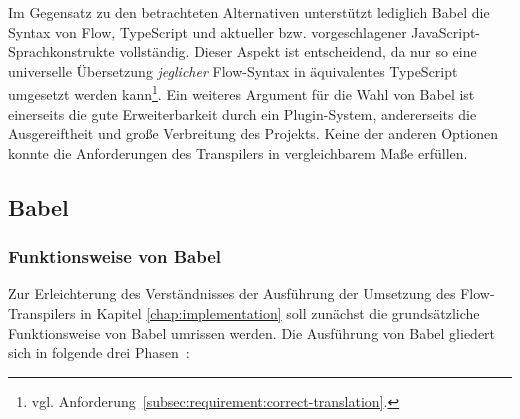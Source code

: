 


Im Gegensatz zu den betrachteten Alternativen unterstützt lediglich Babel die Syntax von Flow, TypeScript und aktueller bzw. vorgeschlagener JavaScript-Sprachkonstrukte vollständig. Dieser Aspekt ist entscheidend, da nur so eine universelle Übersetzung \emph{jeglicher} Flow-Syntax in äquivalentes TypeScript umgesetzt werden kann\footnote{vgl. Anforderung~\ref{subsec:requirement:correct-translation}.}.
Ein weiteres Argument für die Wahl von Babel ist einerseits die gute Erweiterbarkeit durch ein Plugin-System, andererseits die Ausgereiftheit und große Verbreitung des Projekts. Keine der anderen Optionen konnte die Anforderungen des Transpilers in vergleichbarem Maße erfüllen.

\subsection{Babel}
\label{sec:babel}

\subsubsection{Funktionsweise von Babel}

Zur Erleichterung des Verständnisses der Ausführung der Umsetzung des Flow-Transpilers in Kapitel \ref{chap:implementation} soll zunächst die grundsätzliche Funktionsweise von Babel umrissen werden. Die Ausführung von Babel gliedert sich in folgende drei Phasen~\autocite{BABEL:HANDBOOK}:

